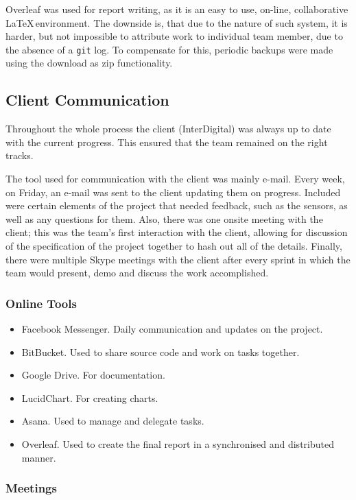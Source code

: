 Overleaf was used for report writing, as it is an easy to use, on-line, collaborative \LaTeX\,environment. The downside is, that due to the nature of such system, it is harder, but not impossible to attribute work to individual team member, due to the absence of a \lstinline{git} log. To compensate for this, periodic backups were made using the download as zip functionality.

\subsection{Client Communication}

Throughout the whole process the client (InterDigital) was always up to date with the current progress. This ensured that the team remained on the right tracks. 

The tool used for communication with the client was mainly e-mail. Every week, on Friday, an e-mail was sent to the client updating them on progress. Included were certain elements of the project that needed feedback, such as the sensors, as well as any questions for them. Also, there was one onsite meeting with the client; this was the team's first interaction with the client, allowing for discussion of the specification of the project together to hash out all of the details. Finally, there were multiple Skype meetings with the client after every sprint in which the team would present, demo and discuss the work accomplished.  

\subsubsection{Online Tools}

\begin{itemize}
\item Facebook Messenger. Daily communication and updates on the project.
\item BitBucket. Used to share source code and work on tasks together.
\item Google Drive. For documentation.
\item LucidChart. For creating charts.
\item Asana. Used to manage and delegate tasks.
\item Overleaf. Used to create the final report in a synchronised and distributed manner.
\end{itemize}

\subsubsection{Meetings}

